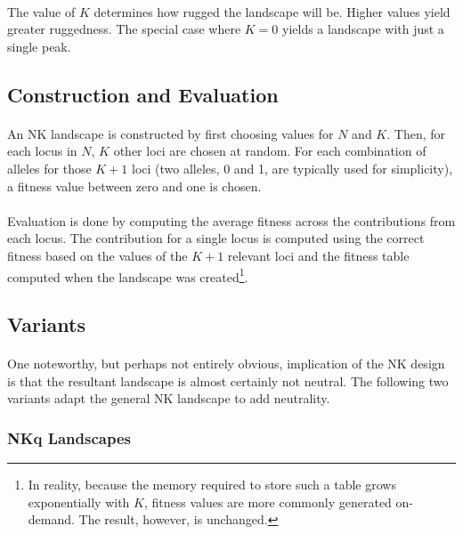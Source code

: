 \documentclass[12pt,letterpaper,titlepage,draft]{article}
\begin{document}
\paragraph{}
The value of $K$ determines how rugged the landscape will be. Higher values
yield greater ruggedness. The special case where $K=0$ yields a landscape with
just a single peak.

\subsection{Construction and Evaluation}

\paragraph{}
An NK landscape is constructed by first choosing values for $N$ and $K$. Then,
for each locus in $N$, $K$ other loci are chosen at random. For each
combination of alleles for those $K+1$ loci (two alleles, 0 and 1, are
typically used for simplicity), a fitness value between zero and one is chosen.

\paragraph{}
Evaluation is done by computing the average fitness across the contributions
from each locus. The contribution for a single locus is computed using the
correct fitness based on the values of the $K+1$ relevant loci and the fitness
table computed when the landscape was created\footnote{In reality, because the
memory required to store such a table grows exponentially with $K$, fitness
values are more commonly generated on-demand. The result, however, is
unchanged.}.

\subsection{Variants}

\paragraph{}
One noteworthy, but perhaps not entirely obvious, implication of the NK design
is that the resultant landscape is almost certainly not neutral. The following
two variants adapt the general NK landscape to add neutrality.

\subsubsection{NKq Landscapes}
\end{document}
